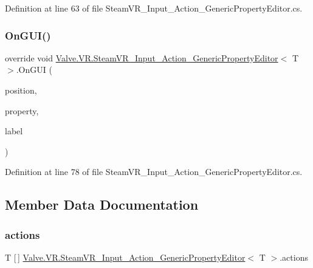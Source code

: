 Definition at line 63 of file Steam\+V\+R\+\_\+\+Input\+\_\+\+Action\+\_\+\+Generic\+Property\+Editor.\+cs.

\mbox{\label{class_valve_1_1_v_r_1_1_steam_v_r___input___action___generic_property_editor_a4e85201555d8fa558345c09e76cdea32}} 
\subsubsection{\texorpdfstring{OnGUI()}{OnGUI()}}
{\footnotesize\ttfamily override void \mbox{\hyperlink{class_valve_1_1_v_r_1_1_steam_v_r___input___action___generic_property_editor}{Valve.\+V\+R.\+Steam\+V\+R\+\_\+\+Input\+\_\+\+Action\+\_\+\+Generic\+Property\+Editor}}$<$ T $>$.On\+G\+UI (\begin{DoxyParamCaption}\item[{Rect}]{position,  }\item[{Serialized\+Property}]{property,  }\item[{G\+U\+I\+Content}]{label }\end{DoxyParamCaption})}



Definition at line 78 of file Steam\+V\+R\+\_\+\+Input\+\_\+\+Action\+\_\+\+Generic\+Property\+Editor.\+cs.



\subsection{Member Data Documentation}
\mbox{\label{class_valve_1_1_v_r_1_1_steam_v_r___input___action___generic_property_editor_a3b0ec4a4489c469cbf1a8fd74c2c9c3d}} 
\subsubsection{\texorpdfstring{actions}{actions}}
{\footnotesize\ttfamily T \mbox{[}$\,$\mbox{]} \mbox{\hyperlink{class_valve_1_1_v_r_1_1_steam_v_r___input___action___generic_property_editor}{Valve.\+V\+R.\+Steam\+V\+R\+\_\+\+Input\+\_\+\+Action\+\_\+\+Generic\+Property\+Editor}}$<$ T $>$.actions\hspace{0.3cm}{\ttfamily [protected]}}




